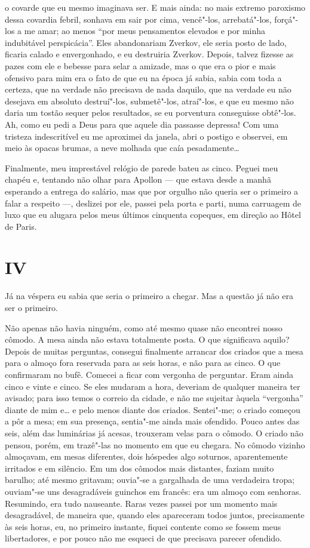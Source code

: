 o covarde que eu mesmo imaginava ser. E mais ainda: no mais extremo
paroxismo dessa covardia febril, sonhava em sair por cima, vencê"-los,
arrebatá"-los, forçá"-los a me amar; ao menos “por meus pensamentos
elevados e por minha indubitável perspicácia”. Eles abandonariam
Zverkov, ele seria posto de lado, ficaria calado e envergonhado, e eu
destruiria Zverkov. Depois, talvez fizesse as pazes com ele e bebesse
para selar a amizade, mas o que era o pior e mais ofensivo para mim era
o fato de que eu na época já sabia, sabia com toda a certeza, que na
verdade não precisava de nada daquilo, que na verdade eu não desejava
em absoluto destruí"-los, submetê"-los, atraí"-los, e que eu mesmo não
daria um tostão sequer pelos resultados, se eu porventura conseguisse
obtê"-los. Ah, como eu pedi a Deus para que aquele dia passasse
depressa! Com uma tristeza indescritível eu me aproximei da janela,
abri o postigo e observei, em meio às opacas brumas, a neve molhada que
caía pesadamente\ldots{}

Finalmente, meu imprestável relógio de parede bateu as cinco. Peguei meu
chapéu e, tentando não olhar para Apollon --- que estava desde a manhã
esperando a entrega do salário, mas que por orgulho não queria ser o
primeiro a falar a respeito ---, deslizei por ele, passei pela porta e
parti, numa carruagem de luxo que eu alugara pelos meus últimos
cinquenta copeques, em direção ao Hôtel de \mbox{Paris}.


\section{IV}

Já na véspera eu sabia que seria o primeiro a chegar. Mas a questão já
não era ser o primeiro.

Não apenas não havia ninguém, como até mesmo quase não encontrei nosso
cômodo. A mesa ainda não estava totalmente posta. O que significava
aquilo? Depois de muitas perguntas, consegui finalmente arrancar dos
criados que a mesa para o almoço fora reservada para as seis horas, e
não para as cinco. O que confirmaram no bufê. Comecei a ficar com
vergonha de perguntar. Eram ainda cinco e vinte e cinco. Se eles
mudaram a hora, deveriam de qualquer maneira ter avisado; para isso
temos o correio da cidade, e não me sujeitar àquela “vergonha” diante
de mim e\ldots{} e pelo menos diante dos criados. Sentei"-me; o criado começou
a pôr a mesa; em sua presença, sentia"-me ainda mais ofendido. Pouco
antes das seis, além das luminárias já acesas, trouxeram velas para o
cômodo. O criado não pensou, porém, em trazê"-las no momento em que eu
chegara. No cômodo vizinho almoçavam, em mesas diferentes, dois
hóspedes algo soturnos, aparentemente irritados e em silêncio. Em um
dos cômodos mais distantes, faziam muito barulho; até mesmo gritavam;
ouvia"-se a gargalhada de uma verdadeira tropa; ouviam"-se uns
desagradáveis guinchos em francês: era um almoço com senhoras.
Resumindo, era tudo nauseante. Raras vezes passei por um momento mais
desagradável, de maneira que, quando eles apareceram todos juntos,
precisamente às seis horas, eu, no primeiro instante, fiquei contente
como se fossem meus libertadores, e por pouco não me esqueci de que
precisava parecer ofendido.

